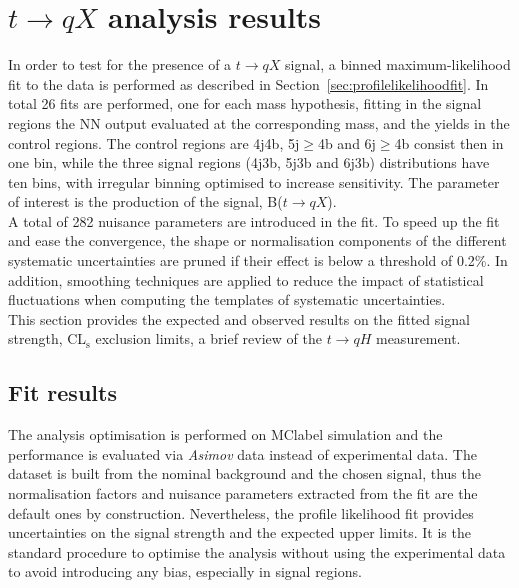 \chapter{$t\to qX$ analysis results}
\label{chapter:tqXresults}

In order to test for the presence of a $t\to qX$ signal, a binned maximum-likelihood fit to the data is performed as described in Section~\ref{sec:profilelikelihoodfit}. In total 26 fits are performed, one for each mass hypothesis, fitting in the signal regions the NN output evaluated at the corresponding mass, and the yields in the control regions. The control regions are 4j4b, 5j$\geq$4b and 6j$\geq$4b consist then in one bin, while the three signal regions (4j3b, 5j3b and 6j3b) distributions have ten bins, with irregular binning optimised to increase sensitivity. The parameter of interest is the production of the signal, B($t\to qX$).\\

A total of 282 nuisance parameters are introduced in the fit. To speed up the fit and ease the convergence, the shape or normalisation components of the different systematic uncertainties are pruned if their effect is below a threshold of 0.2\%. In addition, smoothing techniques are applied to reduce the impact of statistical fluctuations when computing the templates of systematic uncertainties.\\

This section provides the expected and observed results on the fitted signal strength, CL$_{\text{s}}$ exclusion limits, a brief review of the $t\to qH$ measurement.

\section{Fit results}

The analysis optimisation is performed on \acrshort{MClabel} simulation and the performance is evaluated via \textit{Asimov} data instead of experimental data. The dataset is built from the nominal background and the chosen signal, thus the normalisation factors and nuisance parameters extracted from the fit are the default ones by construction. Nevertheless, the profile likelihood fit provides uncertainties on the signal strength and the expected upper limits. It is the standard procedure to optimise the analysis without using the experimental data to avoid introducing any bias, especially in signal regions.\\

